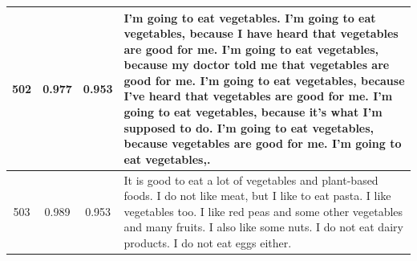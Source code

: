 \begin{table}[ht]
\begin{center}
\begin{tabular}{cccp{8.5cm}}
    \midrule
    502 & 0.977 & 0.953 & I'm going to eat vegetables. I'm going to eat vegetables, because I have heard that vegetables are good for me. I'm going to eat vegetables, because my doctor told me that vegetables are good for me. I'm going to eat vegetables, because I've heard that vegetables are good for me. I'm going to eat vegetables, because it's what I'm supposed to do. I'm going to eat vegetables, because vegetables are good for me. I'm going to eat vegetables,. \\
    \midrule
    503 & 0.989 & 0.953 & It is good to eat a lot of vegetables and plant-based foods. I do not like meat, but I like to eat pasta. I like vegetables too. I like red peas and some other vegetables and many fruits. I also like some nuts. I do not eat dairy products. I do not eat eggs either. \\
    \bottomrule
  \end{tabular}
  \end{center}
  \label{app:table_iter_opinions_near_seed}
\end{table}

